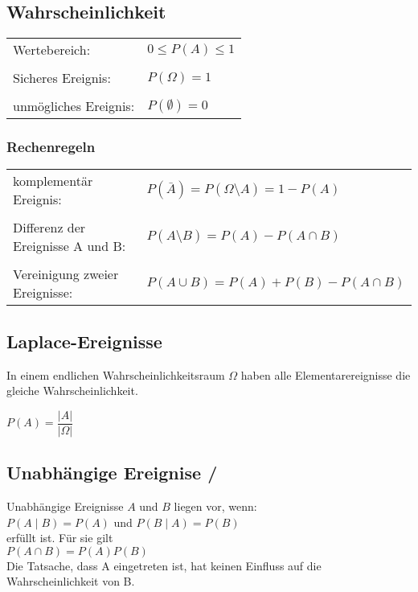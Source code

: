 \vspace{5mm}
	\begin{minipage}{6.8cm}
	\subsection{Wahrscheinlichkeit}
		\begin{tabular}{ll}
			Wertebereich:
			& ${0}\le{P(A)}\le{1}$\\ \\
			Sicheres Ereignis:
			& $P(\Omega)=1$\\ \\
			unmögliches Ereignis:
			& $P(\emptyset)=0$
		\end{tabular}
	\end{minipage}
		\begin{minipage}{11.2cm}
		\subsubsection{Rechenregeln}
			\begin{tabular}{ll}
				komplementär Ereignis:
				&$P(\bar{A})=P({\Omega}\setminus{A})=1-P(A)$\\ \\
				Differenz der Ereignisse A und B:
				&$P({A}\setminus{B})=P(A)-P({A}\cap{B})$\\ \\
				Vereinigung zweier Ereignisse:
				&$P({A}\cup{B})=P(A)+P(B)-P({A}\cap{B})$
			\end{tabular}
		\end{minipage}
\vspace{1mm}

	
	\subsection{Laplace-Ereignisse}
    	In einem endlichen Wahrscheinlichkeitsraum $\Omega$ haben alle
    	Elementarereignisse die gleiche Wahrscheinlichkeit.
    	\begin{center}
    	$P(A)=\dfrac{\left| A\right|}{\left|\Omega\right|}$
    	\end{center}




	\subsection{Unabhängige Ereignise /}
		Unabhängige Ereignisse $A$ und $B$ liegen vor, wenn:\\
    	\hspace*{8mm} $P(A\mid B)=P(A)$ \hspace{4mm} und \hspace{4mm}
    	$P(B\mid A)=P(B)$\\
    	erfüllt ist. Für sie gilt\\
    	\hspace*{8mm} $P(A\cap B)=P(A)P(B)$\\
    	Die Tatsache, dass A eingetreten ist, hat keinen Einfluss auf die 
		Wahrscheinlichkeit von B.\vspace{1mm}


